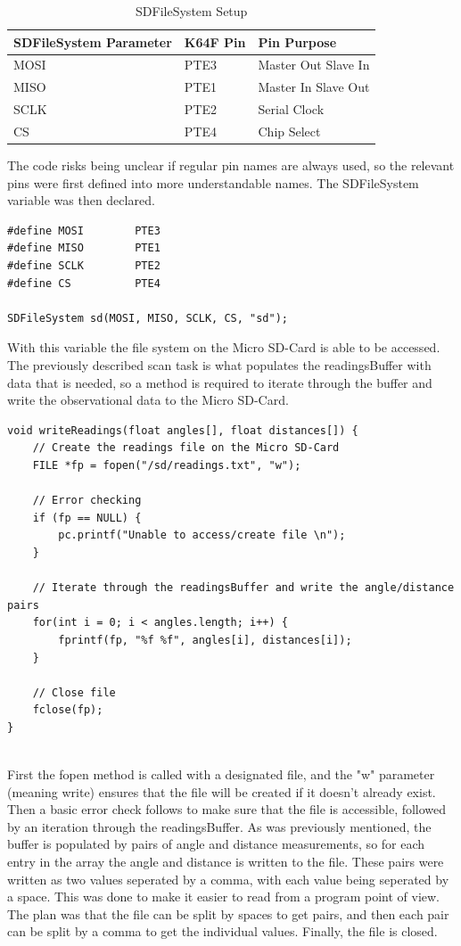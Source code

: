 				\begin{table}[h!]
					\centering
					\begin{tabular}{| l | l | l |} 
						\hline
						SDFileSystem Parameter & K64F Pin & Pin Purpose \\ [0.5ex] 
						\hline
						MOSI  & PTE3 & Master Out Slave In \\ 
						MISO  & PTE1  & Master In Slave Out \\
						SCLK  & PTE2 & Serial Clock \\
						CS & PTE4 & Chip Select \\ [1ex] 
						\hline
					\end{tabular}
					\caption{SDFileSystem Setup}
					\label{table:sdfilesystempins}
				\end{table}
			
				The code risks being unclear if regular pin names are always used, so the relevant pins were first defined into more understandable names. The SDFileSystem variable was then declared.
				
				\begin{lstlisting}
#define MOSI		PTE3
#define MISO		PTE1
#define	SCLK		PTE2
#define	CS			PTE4
				
SDFileSystem sd(MOSI, MISO, SCLK, CS, "sd");
				\end{lstlisting}
				
				With this variable the file system on the Micro SD-Card is able to be accessed. The previously described scan task is what populates the readingsBuffer with data that is needed, so a method is required to iterate through the buffer and write the observational data to the Micro SD-Card.
				
				\begin{lstlisting}
void writeReadings(float angles[], float distances[]) {
	// Create the readings file on the Micro SD-Card
	FILE *fp = fopen("/sd/readings.txt", "w");
					
	// Error checking
	if (fp == NULL) {
		pc.printf("Unable to access/create file \n");
	}
					
	// Iterate through the readingsBuffer and write the angle/distance pairs
	for(int i = 0; i < angles.length; i++) {
		fprintf(fp, "%f %f", angles[i], distances[i]);
	}
					
	// Close file
	fclose(fp);
}
				
				\end{lstlisting}
				First the fopen method is called with a designated file, and the "w" parameter (meaning write) ensures that the file will be created if it doesn't already exist. Then a basic error check follows to make sure that the file is accessible, followed by an iteration through the readingsBuffer. As was previously mentioned, the buffer is populated by pairs of angle and distance measurements, so for each entry in the array the angle and distance is written to the file. These pairs were written as two values seperated by a comma, with each value being seperated by a space. This was done to make it easier to read from a program point of view. The plan was that the file can be split by spaces to get pairs, and then each pair can be split by a comma to get the individual values. Finally, the file is closed.
				

